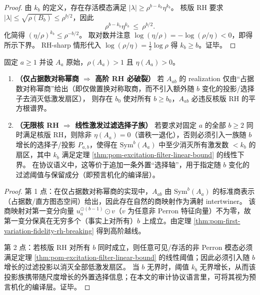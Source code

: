 
\begin{proof}
由 \(k_b\) 的定义，存在存活模态满足 \(|\lambda|\ge \rho^{b-k_b}\eta^{k_b}\)。
核版 RH 要求 \(|\lambda|\le \sqrt{\rho(B_b)}\le \rho^{b/2}\)，因此
\[
\rho^{b-k_b}\eta^{k_b}\ \le\ \rho^{b/2}.
\]
化简得 \((\eta/\rho)^{k_b}\le \rho^{-b/2}\)。
取对数并注意 \(\log(\eta/\rho)=-\log(\rho/\eta)<0\)，即得所示下界。
RH-sharp 情形代入 \(\log(\rho/\eta)=\tfrac12\log\rho\) 得 \(k_b\ge b\)。证毕。
\end{proof}

\begin{theorem}[仅占据数对称幂商 \texorpdfstring{$\Rightarrow$}{=>} 高阶 RH 必破裂；无限核 RH \texorpdfstring{$\Rightarrow$}{=>} 线性激发过滤选择子族]\label{thm:pom-occupancy-symquotient-rh-obstruction}
固定 \(a\ge 1\) 并设 \(A_a\) 原始，\(\rho(A_a)>1\) 且 \(\eta(A_a)>0\)。
\begin{enumerate}
  \item \textbf{（仅占据数对称幂商 \(\Rightarrow\) 高阶 RH 必破裂）}
  若 \(A_{ab}\) 的 realization 仅由“占据数对称幂商”给出（即仅做置换对称取商，而不引入额外随 \(b\) 变化的投影/选择子去消灭低激发扇区），
  则存在 \(b_0\) 使对所有 \(b\ge b_0\)，\(A_{ab}\) 必违反核版 RH 的平方根谱界。
  \item \textbf{（无限核 RH \(\Rightarrow\) 线性激发过滤选择子族）}
  若要求对固定 \(a\) 的全部 \(b\ge 2\) 同时满足核版 RH，则除非 \(\eta(A_a)=0\)（谱秩一退化），否则必须引入一族随 \(b\) 增长的选择子/投影 \(P_{a,b}\)，使得在 \(\mathrm{Sym}^b(A_a)\) 中至少消灭所有激发数 \(<k_b\) 的扇区，其中 \(k_b\) 满足定理 \ref{thm:pom-excitation-filter-linear-bound} 的线性下界。
  在协议语义中，这等价于追加一条外置“选择轴”，用于指定随 \(b\) 变化的过滤阈值与保留成分（即预言机化的编译层）。
\end{enumerate}
\end{theorem}
\begin{proof}
第 1 点：在仅占据数对称幂商的实现中，\(A_{ab}\) 由 \(\mathrm{Sym}^b(A_a)\) 的标准商表示（占据数/直方图态空间）给出，因此存在自然的商映射作为满射 intertwiner。
该商映射对第一变分向量 \(u_a^{\odot(b-1)}\odot v\)（\(v\) 为任意非 Perron 特征向量）不为零，故第一变分保真在无穷多个（事实上对所有）\(b\) 上成立。由定理 \ref{thm:pom-first-variation-fidelity-rh-breaking} 得到高阶越线。
\par
第 2 点：若核版 RH 对所有 \(b\) 同时成立，则任意可见/存活的非 Perron 模态必须满足定理 \ref{thm:pom-excitation-filter-linear-bound} 的线性阈值；因此必须引入随 \(b\) 增长的过滤投影以消灭全部低激发扇区。
当 \(b\) 无界时，阈值 \(k_b\) 无界增长，从而该投影族携带随尺度增长的外置选择信息；在本文的审计协议语言里，可将其视为预言机化的编译层。证毕。
\end{proof}

